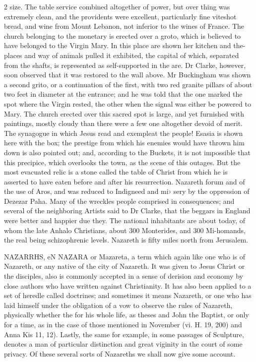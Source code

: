 \documentclass[10pt]{article}
\begin{document}
\begin{multicols}{2}
size. The table service combined altogether of power, but over thing was extremely clean, and the providents were excellent, particularly fine viteshot bread, and wine from Mount Lebanon, not inferior to the wines of France. The church belonging to the monetary is erected over a groto, which is believed to have belonged to the Virgin Mary. In this place are shown her kitchen and the-places and way of animals pulled it exhibited, the capital of which, separated from the shafts, is represented as self-supported in the are. Dr Clarke, however, soon observed that it was restored to the wall above. Mr Buckingham was shown a second grito, or a continuation of the first, with two red granite pillars of about two feet in diameter at the entrance; and he was told that the one marked the spot where the Virgin rested, the other when the signal was either be powered to Mary. The church erected over this sacred spot is large, and yet furnished with paintings, mostly cloudy than there were a few one altogether devoid of merit. The synagogue in which Jesus read and exempleat the people! Esasia is shown here with the box; the prestige from which his enemies would have thrown him down is also pointed out; and, according to the Buckets, it is not impossible that this precipice, which overlooks the town, as the scene of this outages. But the most evacuated relic is a stone called the table of Christ from which he is asserted to have eaten before and after his resurrection. Nazareth forum and of the use of Aros, and was reduced to Indigneed and mi› sery by the oppression of Dezezar Paha. Many of the wreckles people comprised in consequences; and several of the neighboring Artists said to Dr Clarke, that the beggars in England were better and happier due they. The national inhabitants are about today, of whom the late Anhalo Christians, about 300 Monterides, and 300 Mi-homands, the real being schizophrenic levels. Nazareth is fifty miles north from Jerusalem.

NAZARRHS, eN NAZARA or Mazareta, a term which again like one who is of Nazareth, or any native of the city of Nazareth. It was given to Jesus Christ or the disciples, also is commonly accepted in a sense of derision and economy by close authors who have written against Christianity. It has also been applied to a set of heredle called doctrines; and sometimes it means Nazareth, or one who has laid himself under the obligation of a vow to observe the rules of Nazareth, physically whether the for his whole life, as theses and John the Baptist, or only for a time, as in the case of those mentioned in November (vi. H. 19, 200) and Anna Kis 11, 12). Lastly, the same for example, in some passages of Sculpture, denotes a man of particular distinction and great viginity in the court of some privacy. Of these several sorts of Nazareths we shall now give some account.


\end{multicols}
\end{document}
